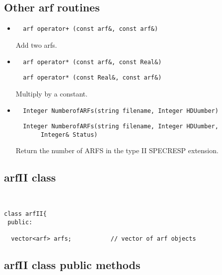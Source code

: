 \documentclass[11pt]{book}
\begin{document}
\subsection{Other arf routines}

\begin{itemize}

\item  \begin{verbatim}  arf operator+ (const arf&, const arf&) \end{verbatim}

          Add two arfs.

\item  \begin{verbatim}  arf operator* (const arf&, const Real&) \end{verbatim}
       \begin{verbatim}  arf operator* (const Real&, const arf&) \end{verbatim}

          Multiply by a constant.

\item  \begin{verbatim}  Integer NumberofARFs(string filename, Integer HDUumber) \end{verbatim}
       \begin{verbatim}  Integer NumberofARFs(string filename, Integer HDUumber, 
       Integer& Status) \end{verbatim}

          Return the number of ARFS in the type II SPECRESP extension.

\end{itemize}


\subsection{arfII class}

\begin{verbatim}


class arfII{
 public:

  vector<arf> arfs;           // vector of arf objects

\end{verbatim}

\subsection{arfII class public methods}
\end{document}

